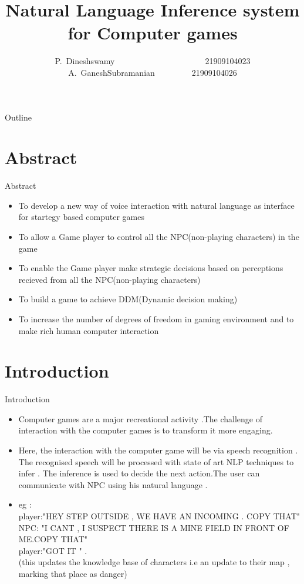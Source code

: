 \documentclass{beamer}
\title[Natural Language Inference system for Computer games]
{Natural Language Inference system for Computer games}
\author[] 
{
\footnotesize
P.~Dineshswamy~~~~~~~~~~~~~~~~~~~~~~21909104023\\
A.~GaneshSubramanian~~~~~~~~~21909104026\\
}
\institute[Sri Venkateswara College of Engineering] 
{
\textbf{Guided By: Dr.V. Vidhya, Phd}\\
Assistant Professor\\
Department of Computer Science and Engineering\\
 Sri Venkateswara College of Engineering
}
\begin{document}
\begin{frame}
  \titlepage
\end{frame}
\begin{frame}{Outline}
  \tableofcontents
\end{frame}
\section{Abstract}
\begin{frame}{Abstract}
\small
\begin{itemize}
\item
To develop a new way of voice interaction with natural language as interface  for  startegy based computer games 
\item
To allow a Game player to control all the NPC(non-playing characters) in the game 
\item
To enable the Game player make strategic decisions based on perceptions recieved from all the NPC(non-playing characters)
\item
To build a game to achieve DDM(Dynamic decision making)
\item
To increase the number of degrees of freedom in gaming environment and to make  rich human  computer interaction
  \end{itemize}
\end{frame}

\section{Introduction}
\begin{frame}{Introduction}
\footnotesize
\begin{itemize}
\item
Computer games are a major recreational activity .The challenge of interaction with the computer games is to transform it more engaging.
\item		
Here, the interaction with the computer game will be via speech recognition . The  recognised speech  will be processed with state of art NLP techniques to infer . The inference is used to decide the next action.The user can communicate with NPC using his natural language .
\item
			eg :\\
					player:"HEY STEP OUTSIDE , WE HAVE AN INCOMING . COPY THAT"\\
					NPC: "I CANT , I SUSPECT THERE IS A MINE FIELD IN FRONT OF ME.COPY THAT"\\
					player:"GOT IT " .\\
 (this updates the knowledge base of characters i.e an update to their map , marking that place as danger)
  \end{itemize}
\end{frame}
\end{document}
